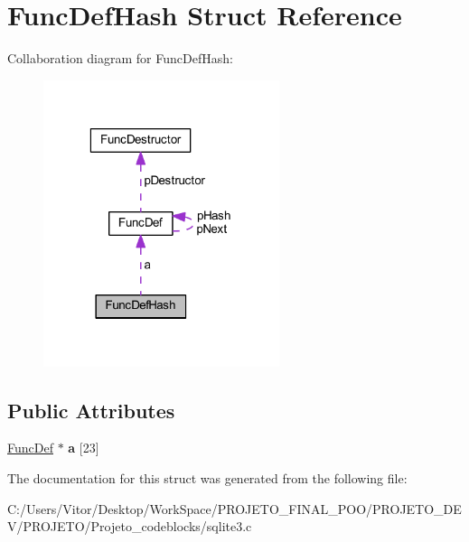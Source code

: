 \hypertarget{struct_func_def_hash}{\section{Func\-Def\-Hash Struct Reference}
\label{struct_func_def_hash}
}


Collaboration diagram for Func\-Def\-Hash\-:\nopagebreak
\begin{figure}[H]
\begin{center}
\leavevmode
\includegraphics[width=196pt]{struct_func_def_hash__coll__graph}
\end{center}
\end{figure}
\subsection*{Public Attributes}
\begin{DoxyCompactItemize}
\item 
\hypertarget{struct_func_def_hash_a3e044ccfe432770ef7297e86e405cc96}{\hyperlink{struct_func_def}{Func\-Def} $\ast$ {\bfseries a} \mbox{[}23\mbox{]}}\label{struct_func_def_hash_a3e044ccfe432770ef7297e86e405cc96}

\end{DoxyCompactItemize}


The documentation for this struct was generated from the following file\-:\begin{DoxyCompactItemize}
\item 
C\-:/\-Users/\-Vitor/\-Desktop/\-Work\-Space/\-P\-R\-O\-J\-E\-T\-O\-\_\-\-F\-I\-N\-A\-L\-\_\-\-P\-O\-O/\-P\-R\-O\-J\-E\-T\-O\-\_\-\-D\-E\-V/\-P\-R\-O\-J\-E\-T\-O/\-Projeto\-\_\-codeblocks/sqlite3.\-c\end{DoxyCompactItemize}
